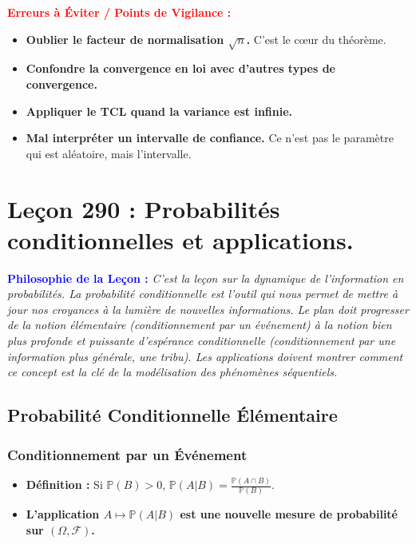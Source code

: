 \documentclass[12pt, a4paper, parskip=full]{report}
\theoremstyle{agregstyle}
\newenvironment{philosophie}
  {\par\medskip\noindent\begin{oframed}\noindent\textbf{\textcolor{blue}{Philosophie de la Leçon :}}\itshape}
  {\end{oframed}\par\medskip}
\newenvironment{erreurs}
  {\par\medskip\noindent\begin{oframed}\noindent\textbf{\textcolor{red}{Erreurs à Éviter / Points de Vigilance :}}}
  {\end{oframed}\par\medskip}
\begin{document}
\begin{erreurs}
    \begin{itemize}
        \item \textbf{Oublier le facteur de normalisation $\sqrt{n}$.} C'est le cœur du théorème.
        \item \textbf{Confondre la convergence en loi avec d'autres types de convergence.}
        \item \textbf{Appliquer le TCL quand la variance est infinie.}
        \item \textbf{Mal interpréter un intervalle de confiance.} Ce n'est pas le paramètre qui est aléatoire, mais l'intervalle.
    \end{itemize}
\end{erreurs}
\chapter{Leçon 290 : Probabilités conditionnelles et applications.}

\begin{philosophie}
    C'est la leçon sur la dynamique de l'information en probabilités. La probabilité conditionnelle est l'outil qui nous permet de mettre à jour nos croyances à la lumière de nouvelles informations. Le plan doit progresser de la notion élémentaire (conditionnement par un événement) à la notion bien plus profonde et puissante d'espérance conditionnelle (conditionnement par une information plus générale, une tribu). Les applications doivent montrer comment ce concept est la clé de la modélisation des phénomènes séquentiels.
\end{philosophie}

\section{Probabilité Conditionnelle Élémentaire}
\subsection{Conditionnement par un Événement}
\begin{itemize}
    \item \textbf{Définition :} Si $\mathbb{P}(B)>0$, $\mathbb{P}(A|B) = \frac{\mathbb{P}(A \cap B)}{\mathbb{P}(B)}$.
    \item \textbf{L'application $A \mapsto \mathbb{P}(A|B)$ est une nouvelle mesure de probabilité sur $(\Omega, \mathcal{F})$.}
\end{itemize}
\end{document}
